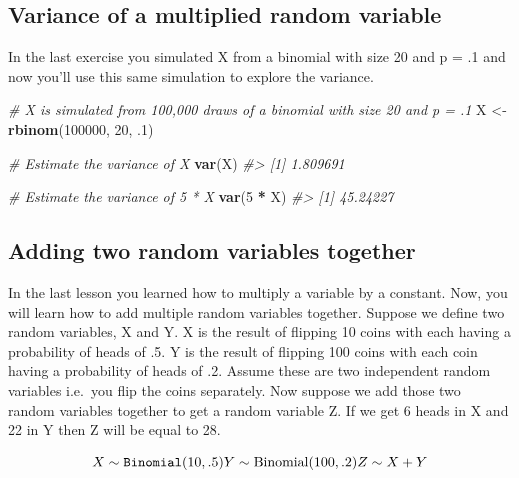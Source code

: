 \documentclass[]{article}
\newenvironment{Shaded}{\begin{snugshade}}{\end{snugshade}}
\newcommand{\CommentTok}[1]{\textcolor[rgb]{0.56,0.35,0.01}{\textit{#1}}}
\newcommand{\DecValTok}[1]{\textcolor[rgb]{0.00,0.00,0.81}{#1}}
\newcommand{\FloatTok}[1]{\textcolor[rgb]{0.00,0.00,0.81}{#1}}
\newcommand{\KeywordTok}[1]{\textcolor[rgb]{0.13,0.29,0.53}{\textbf{#1}}}
\newcommand{\NormalTok}[1]{#1}
\newcommand{\OperatorTok}[1]{\textcolor[rgb]{0.81,0.36,0.00}{\textbf{#1}}}
\newcommand{\StringTok}[1]{\textcolor[rgb]{0.31,0.60,0.02}{#1}}
\begin{document}
\hypertarget{variance-of-a-multiplied-random-variable}{%
\subsection{Variance of a multiplied random
variable}\label{variance-of-a-multiplied-random-variable}}

In the last exercise you simulated X from a binomial with size 20 and p
= .1 and now you'll use this same simulation to explore the variance.

\begin{Shaded}
\begin{Highlighting}[]
\CommentTok{# X is simulated from 100,000 draws of a binomial with size 20 and p = .1}
\NormalTok{X <-}\StringTok{ }\KeywordTok{rbinom}\NormalTok{(}\DecValTok{100000}\NormalTok{, }\DecValTok{20}\NormalTok{, }\FloatTok{.1}\NormalTok{)}

\CommentTok{# Estimate the variance of X}
\KeywordTok{var}\NormalTok{(X)}
\CommentTok{#> [1] 1.809691}

\CommentTok{# Estimate the variance of 5 * X}
\KeywordTok{var}\NormalTok{(}\DecValTok{5} \OperatorTok{*}\StringTok{ }\NormalTok{X)}
\CommentTok{#> [1] 45.24227}
\end{Highlighting}
\end{Shaded}

\hypertarget{adding-two-random-variables-together}{%
\subsection{Adding two random variables
together}\label{adding-two-random-variables-together}}

In the last lesson you learned how to multiply a variable by a constant.
Now, you will learn how to add multiple random variables together.
Suppose we define two random variables, X and Y. X is the result of
flipping 10 coins with each having a probability of heads of .5. Y is
the result of flipping 100 coins with each coin having a probability of
heads of .2. Assume these are two independent random variables i.e.~you
flip the coins separately. Now suppose we add those two random variables
together to get a random variable Z. If we get 6 heads in X and 22 in Y
then Z will be equal to 28.

\[X \sim \texttt{Binomial}(10, .5) \\ Y \sim \textrm{Binomial}(100, .2) \\ Z \sim X + Y\]
\end{document}
